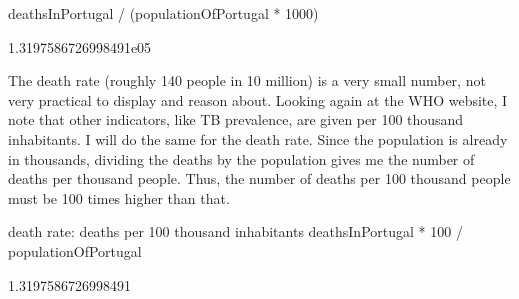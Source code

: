 \documentclass[letterpaper,10pt,english]{sphinxmanual}
\begin{document}

{
\begin{sphinxVerbatim}[commandchars=\\\{\}]
\llap{\color{nbsphinxin}[ ]:\,\hspace{\fboxrule}\hspace{\fboxsep}}
deathsInPortugal / (populationOfPortugal * 1000)
\end{sphinxVerbatim}
}


{
\begin{sphinxVerbatim}[commandchars=\\\{\}]
\llap{\color{nbsphinxin}[ ]:\,\hspace{\fboxrule}\hspace{\fboxsep}}
1.3197586726998491e\PYGZhy{}05
\end{sphinxVerbatim}
}

The death rate (roughly 140 people in 10 million) is a very small number, not very practical to display and reason about. Looking again at the WHO website, I note that other indicators, like TB prevalence, are given per 100 thousand inhabitants. I will do the same for the death rate. Since the population is already in thousands, dividing the deaths by the population gives me the number of deaths per thousand people. Thus, the number of deaths per 100 thousand people must be 100 times higher than
that.


{
\begin{sphinxVerbatim}[commandchars=\\\{\}]
\llap{\color{nbsphinxin}[ ]:\,\hspace{\fboxrule}\hspace{\fboxsep}}
\PYGZsh{} death rate: deaths per 100 thousand inhabitants
deathsInPortugal * 100 / populationOfPortugal
\end{sphinxVerbatim}
}


{
\begin{sphinxVerbatim}[commandchars=\\\{\}]
\llap{\color{nbsphinxin}[ ]:\,\hspace{\fboxrule}\hspace{\fboxsep}}
1.3197586726998491
\end{sphinxVerbatim}
}
\end{document}
